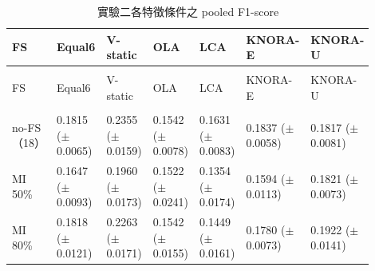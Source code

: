 \begingroup
\small{}\setlength{\tabcolsep}{3pt}
\setlength{\LTleft}{\fill}\setlength{\LTright}{\fill}
\begin{longtable}{@{}>{\raggedright\arraybackslash}p{0.16\linewidth}>{\raggedright\arraybackslash}p{0.123\linewidth}>{\raggedright\arraybackslash}p{0.123\linewidth}>{\raggedright\arraybackslash}p{0.123\linewidth}>{\raggedright\arraybackslash}p{0.123\linewidth}>{\raggedright\arraybackslash}p{0.123\linewidth}>{\raggedright\arraybackslash}p{0.123\linewidth}@{}}
\caption{實驗二各特徵條件之 pooled F1-score}\label{tab:results-fs-f1}\\
\toprule
FS & Equal6 & V-static & OLA & LCA & KNORA-E & KNORA-U \\
\midrule\endfirsthead
\multicolumn{7}{c}{表~\thetable（續）}\\
\toprule
FS & Equal6 & V-static & OLA & LCA & KNORA-E & KNORA-U \\
\midrule\endhead
\midrule\multicolumn{7}{r}{續下頁}\\\endfoot
\bottomrule\endlastfoot
no-FS（18） & \shortstack[l]{0.1815\\{\scriptsize(\(\pm\)0.0065)}} & \shortstack[l]{0.2355\\{\scriptsize(\(\pm\)0.0159)}} & \shortstack[l]{0.1542\\{\scriptsize(\(\pm\)0.0078)}} & \shortstack[l]{0.1631\\{\scriptsize(\(\pm\)0.0083)}} & \shortstack[l]{0.1837\\{\scriptsize(\(\pm\)0.0058)}} & \shortstack[l]{0.1817\\{\scriptsize(\(\pm\)0.0081)}} \\
MI 50\% & \shortstack[l]{0.1647\\{\scriptsize(\(\pm\)0.0093)}} & \shortstack[l]{0.1960\\{\scriptsize(\(\pm\)0.0173)}} & \shortstack[l]{0.1522\\{\scriptsize(\(\pm\)0.0241)}} & \shortstack[l]{0.1354\\{\scriptsize(\(\pm\)0.0174)}} & \shortstack[l]{0.1594\\{\scriptsize(\(\pm\)0.0113)}} & \shortstack[l]{0.1821\\{\scriptsize(\(\pm\)0.0073)}} \\
MI 80\% & \shortstack[l]{0.1818\\{\scriptsize(\(\pm\)0.0121)}} & \shortstack[l]{0.2263\\{\scriptsize(\(\pm\)0.0171)}} & \shortstack[l]{0.1542\\{\scriptsize(\(\pm\)0.0155)}} & \shortstack[l]{0.1449\\{\scriptsize(\(\pm\)0.0161)}} & \shortstack[l]{0.1780\\{\scriptsize(\(\pm\)0.0073)}} & \shortstack[l]{0.1922\\{\scriptsize(\(\pm\)0.0141)}} \\

\end{longtable}
